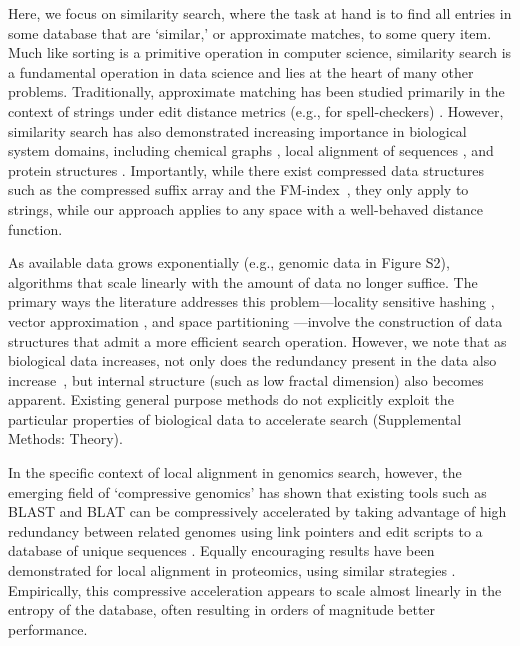 \documentclass[review,preprint,12pt]{elsarticle}
\renewcommand{\cite}{\citep} %
\theoremstyle{definition}
\theoremstyle{remark}
\numberwithin{equation}{section}
\begin{document}
Here, we focus on similarity search, where the task at hand is to find all entries in some database that are `similar,' or approximate matches, to some query item.
Much like sorting is a primitive operation in computer science, similarity search is a fundamental operation in data science and lies at the heart of many other problems.
Traditionally, approximate matching has been studied primarily in the context of strings under edit distance metrics (e.g., for spell-checkers) \cite{ukkonen1985algorithms}.
However, similarity search has also demonstrated increasing importance in biological system domains, including chemical graphs \cite{schaeffer2007graph}, local alignment of sequences \cite{altschul1990basic, kent2002blat}, and protein structures \cite{budowski2010fragbag}.
Importantly, while there exist compressed data structures such as the 
compressed suffix array and the FM-index~\cite{grossi2005compressed, ferragina2000opportunistic}, they only apply to strings, while our approach 
applies to any space with a well-behaved distance function.

As available data grows exponentially \cite{berger2013computational,yu2015quality} (e.g., genomic data in Figure S2), 
algorithms that scale linearly with the amount of data no longer suffice.
The primary ways the literature addresses this problem---locality sensitive 
hashing \cite{indyk1998approximate}, vector approximation 
\cite{ferhatosmanoglu2000vector}, and space partitioning 
\cite{weber1998quantitative}---involve the construction of data structures that admit a more efficient search operation.
However, we note that as biological data increases, not only does the redundancy present in the data also increase~\cite{loh2012compressive}, but 
internal structure (such as low fractal dimension) also becomes apparent.
Existing general purpose methods do not explicitly exploit the particular 
properties of biological data to accelerate search (Supplemental Methods: 
Theory).

In the specific context of local alignment in genomics search, however, the emerging field of `compressive genomics' has shown that existing tools such as BLAST and BLAT can be compressively accelerated by taking advantage of high redundancy between related genomes using link pointers and edit scripts to a database of unique sequences \cite{loh2012compressive}.
Equally encouraging results have been demonstrated for local alignment in 
proteomics, using similar strategies \cite{daniels2013compressive}.
Empirically, this compressive acceleration appears to scale almost linearly in the entropy of the database, often resulting in orders of magnitude better performance.
\end{document}

